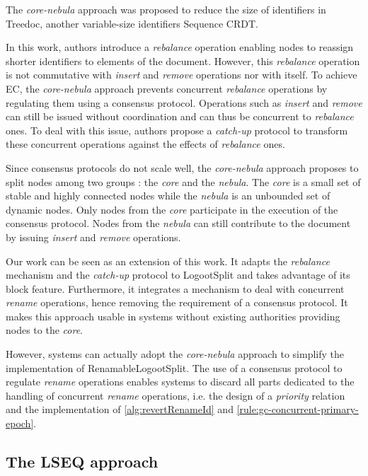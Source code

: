 \documentclass[10pt,journal,compsoc]{IEEEtran}
\newcommand{\ie}{i.e. }
\begin{document}
The \emph{core-nebula} approach \cite{letia:hal-01248270, zawirski:hal-01248197} was proposed to reduce the size of identifiers in Treedoc\cite{5158449}, another variable-size identifiers Sequence \ac{CRDT}.

In this work, authors introduce a \emph{rebalance} operation enabling nodes to reassign shorter identifiers to elements of the document.
However, this \emph{rebalance} operation is not commutative with \emph{insert} and \emph{remove} operations nor with itself.
To achieve \ac{EC}\cite{10.1145/224057.224070}, the \emph{core-nebula} approach prevents concurrent \emph{rebalance} operations by regulating them using a consensus protocol.
Operations such as \emph{insert} and \emph{remove} can still be issued without coordination and can thus be concurrent to \emph{rebalance} ones.
To deal with this issue, authors propose a \emph{catch-up} protocol to transform these concurrent operations against the effects of \emph{rebalance} ones.

Since consensus protocols do not scale well, the \emph{core-nebula} approach proposes to split nodes among two groups : the \emph{core} and the \emph{nebula}.
The \emph{core} is a small set of stable and highly connected nodes while the \emph{nebula} is an unbounded set of dynamic nodes.
Only nodes from the \emph{core} participate in the execution of the consensus protocol.
Nodes from the \emph{nebula} can still contribute to the document by issuing \emph{insert} and \emph{remove} operations.

Our work can be seen as an extension of this work.
It adapts the \emph{rebalance} mechanism and the \emph{catch-up} protocol to LogootSplit and takes advantage of its block feature.
Furthermore, it integrates a mechanism to deal with concurrent \emph{rename} operations, hence removing the requirement of a consensus protocol.
It makes this approach usable in systems without existing authorities providing nodes to the \emph{core}.

However, systems can actually adopt the \emph{core-nebula} approach to simplify the implementation of RenamableLogootSplit.
The use of a consensus protocol to regulate \emph{rename} operations enables systems to discard all parts dedicated to the handling of concurrent \emph{rename} operations, \ie the design of a \emph{priority} relation and the implementation of \autoref{alg:revertRenameId} and \autoref{rule:gc-concurrent-primary-epoch}.

\subsection{The LSEQ approach}
\end{document}
